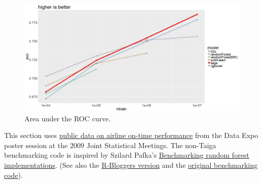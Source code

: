 \documentclass[11pt,american,usenames,dvipsnames,svgnames,x11names,table]{article}
\begin{document}
\begin{figure}[H]
\noindent \begin{centering}
\includegraphics[width=16cm]{ontime/auc.png}
\par\end{centering}
\protect\caption{\label{fig:ontime-auc}Area under the ROC curve.}
\end{figure}


This section uses 
\href{http://stat-computing.org/dataexpo/2009/}
{public data on airline on-time performance} 
from the Data Expo poster session at the
$2009$ Joint Statistical Meetings.
The non-Taiga benchmarking code is inspired by Szilard Pafka's
\href{http://datascience.la/benchmarking-random-forest-implementations/}
{Benchmarking random forest implementations}.
(See also the
\href{https://www.r-bloggers.com/benchmarking-random-forest-implementations/}
{R-Bloggers version}
and the \href{https://github.com/szilard/benchm-ml}
{original benchmarking code}).

%
%
\end{document}
